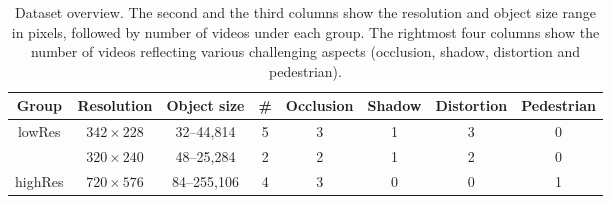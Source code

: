 \begin{table}[!htbp]
\footnotesize
\centering
\caption{Dataset overview. The second and the third columns show the resolution and object size range in pixels, followed by number of videos under each group. The rightmost four columns show the number of videos reflecting various challenging aspects (occlusion, shadow, distortion and pedestrian).}
\begin{tabular}{|c|c||c||c|c|c|c|c|}
    \hline
    Group & Resolution & Object size & \# & Occlusion & Shadow & Distortion & Pedestrian \\ \hline   
    \multirow{2}{*}{lowRes} & $342\times228$ & 32--44,814 & 5 & 3 & 1 & 3 & 0 \\ \cline{2-8}    
    ~                       & $320\times240$ & 48--25,284 & 2 & 2 & 1 & 2 & 0 \\ \hline
    highRes                 & $720\times576$ & 84--255,106 & 4 & 3 & 0 & 0 & 1 \\ \hline
\end{tabular}
\label{table:videos}
\end{table}
